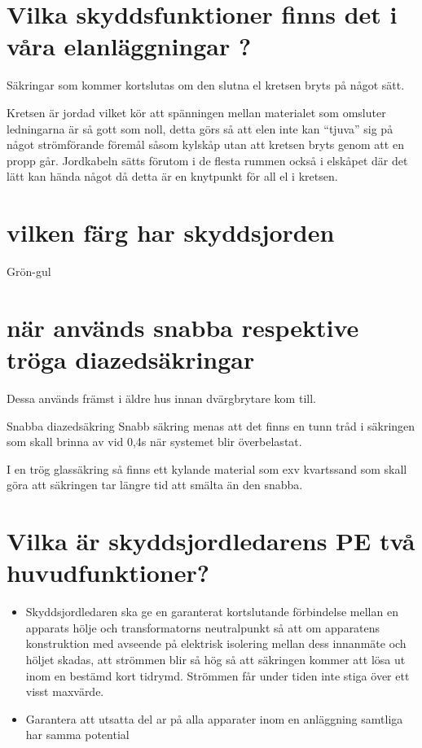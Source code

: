 \documentclass[a4paper,swedish]{article}
\begin{document}
\section{Vilka skyddsfunktioner finns det i våra elanläggningar ?}
\label{sec:q_5}

Säkringar som kommer kortslutas om den slutna el kretsen bryts på något sätt.

Kretsen är jordad vilket kör att spänningen mellan materialet som omsluter ledningarna är så gott som noll,
detta görs så att elen inte kan “tjuva” sig på något strömförande föremål såsom kylskåp utan att kretsen bryts genom
att en propp går. Jordkabeln sätts förutom i de flesta rummen också i elskåpet där det lätt kan hända något då detta är
en knytpunkt för all el i kretsen.

\section{vilken färg har skyddsjorden}
\label{sec:q_7}

Grön-gul

\section{när används snabba respektive tröga diazedsäkringar}
\label{sec:q_9}

Dessa används främst i äldre hus innan dvärgbrytare kom till.

Snabba diazedsäkring
Snabb säkring menas att det finns en tunn tråd i säkringen som skall brinna av vid 0,4s när systemet blir överbelastat.

I en trög glassäkring så finns ett kylande material som exv kvartssand som skall göra att säkringen tar
längre tid att smälta än den snabba.

\section{Vilka är skyddsjordledarens PE två huvudfunktioner?}\label{sec:skyddsjordsledarens_funktioner}

\begin{itemize}
\item Skyddsjordledaren ska ge en garanterat kortslutande förbindelse mellan en apparats hölje
och transformatorns neutralpunkt så att om apparatens konstruktion
med avseende på elektrisk isolering mellan dess innanmäte och höljet skadas, att strömmen
blir så hög så att säkringen kommer att lösa ut inom en bestämd kort tidrymd. Strömmen får under tiden
inte stiga över ett visst maxvärde.
\item Garantera att utsatta del
ar på alla apparater inom en anläggning samtliga har samma potential
\end{itemize}
\end{document}
